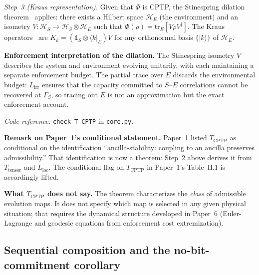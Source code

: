 \documentclass[11pt]{article}
\newcommand{\coderef}[2]{\smallskip\noindent\textit{Code reference:} \texttt{#1} in \texttt{#2}.}
\newcommand{\epitag}[1]{\textbf{[#1]}}
\begin{document}
\begin{tcolorbox}[apfbox, title={Theorem $T_{\mathrm{CPTP}}$ (Complete Positivity) \epitag{P}}]
\smallskip\noindent\textit{Step~3 (Kraus representation).}
Given that $\Phi$ is CPTP, the Stinespring dilation theorem~\cite{Stinespring1955}
applies: there exists a Hilbert space $\mathcal{H}_E$ (the environment) and an isometry
$V: \mathcal{H}_S \to \mathcal{H}_S\otimes\mathcal{H}_E$ such that
$\Phi(\rho) = \mathrm{tr}_E[V\rho V^\dagger]$.  The Kraus operators~\cite{Choi1975,Kraus1983} are
$K_k = (\mathbb{1}_S\otimes\langle k|_E)V$ for any orthonormal basis
$\{|k\rangle\}$ of $\mathcal{H}_E$.

\textbf{Enforcement interpretation of the dilation.}  The Stinespring
isometry $V$ describes the system and environment evolving unitarily, with
each maintaining a separate enforcement budget.  The partial trace over $E$
discards the environmental budget: $L_{\mathrm{irr}}$ ensures that the
capacity committed to $S$--$E$ correlations cannot be recovered at $\Gamma_S$,
so tracing out $E$ is not an approximation but the exact enforcement account.

\coderef{check\_T\_CPTP}{core.py}
\end{tcolorbox}

\smallskip\noindent\textbf{Remark on Paper~1's conditional statement.}
Paper~1 listed $T_{\mathrm{CPTP}}$ as conditional on the identification
``ancilla-stability: coupling to an ancilla preserves admissibility.''  That
identification is now a theorem: Step~2 above derives it from
$T_{\mathrm{tensor}}$ and $L_{\mathrm{loc}}$.  The conditional flag on
$T_{\mathrm{CPTP}}$ in Paper~1's Table~H.1 is accordingly lifted.

\smallskip\noindent\textbf{What $T_{\mathrm{CPTP}}$ does not say.}
The theorem characterizes the \emph{class} of admissible evolution maps.  It
does not specify which map is selected in any given physical situation; that
requires the dynamical structure developed in Paper~6 (Euler-Lagrange and
geodesic equations from enforcement cost extremization).

\subsection{Sequential composition and the no-bit-commitment corollary}
\label{sec:seq}
\end{document}
